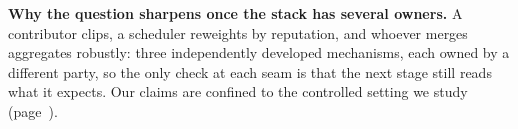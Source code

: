 \documentclass{article}
\begin{document}
\textbf{Why the question sharpens once the stack has several owners.} A contributor clips, a scheduler reweights by reputation, and whoever merges aggregates robustly: three independently developed mechanisms, each owned by a different party, so the only check at each seam is that the next stage still reads what it expects. Our claims are confined to the controlled setting we study (page~\pageref{box:scope}).

\end{document}
